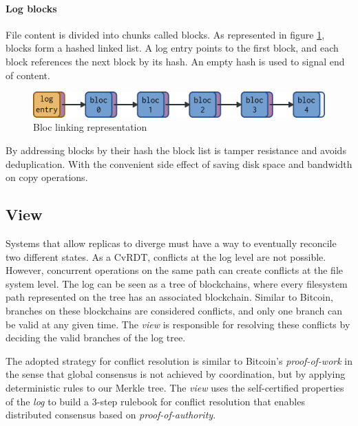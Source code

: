 \documentclass{sig-alternate}
\begin{document}
\paragraph{Log blocks}

File content is divided into chunks called blocks. As represented in figure \ref{fig:blocs}, blocks form a hashed linked list. A log entry points to the first block, and each block references the next block by its hash. An empty hash is used to signal end of content.

\begin{figure}
\centering
\includegraphics[width=\columnwidth]{imgs/blocs.png}
\caption{Bloc linking representation}
\label{fig:blocs}
\end{figure}

By addressing blocks by their hash the block list is tamper resistance and avoids deduplication. With the convenient side effect of saving disk space and bandwidth on copy operations.

\subsection{View} \label{view}

Systems that allow replicas to diverge must have a way to eventually reconcile two different states. As a CvRDT, conflicts at the log level are not possible. However, concurrent operations on the same path can create conflicts at the file system level. The log can be seen as a tree of blockchains\cite{back2014enabling}, where every filesystem path represented on the tree has an associated blockchain. Similar to Bitcoin, branches on these blockchains are considered conflicts, and only one branch can be valid at any given time. The \textit{view} is responsible for resolving these conflicts by deciding the valid branches of the log tree.

The adopted strategy for conflict resolution is similar to Bitcoin's \textit{proof-of-work}\cite{nakamoto2008bitcoin} in the sense that global consensus is not achieved by coordination, but by applying deterministic rules to our Merkle tree. The \textit{view} uses the self-certified properties of the \textit{log} to build a 3-step rulebook for conflict resolution that enables distributed consensus based on \textit{proof-of-authority}.
\end{document}
